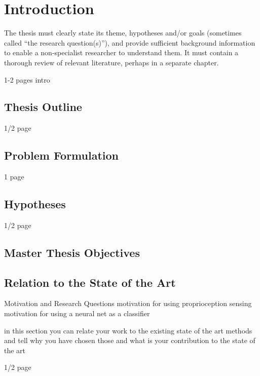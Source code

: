 \chapter{Introduction} \label{chapter:01:introduction}

The thesis must clearly state its theme, hypotheses and/or goals (sometimes called “the research question(s)”), and provide sufficient background information to enable a non-specialist researcher to understand them. It must contain a thorough review of relevant literature, perhaps in a separate chapter.

1-2 pages intro

\section{Thesis Outline}

1/2 page 

\section{Problem Formulation}
1 page

\section{Hypotheses}

1/2 page

\section{Master Thesis Objectives} \label{sec:goals}

\section{Relation to the State of the Art}
Motivation and Research Questions
motivation for using proprioception sensing
motivation for using a neural net as a classifier

in this section you can relate your work to the existing state of the art methods and tell why you have chosen those and what is your contribution to the state of the art

1/2 page

